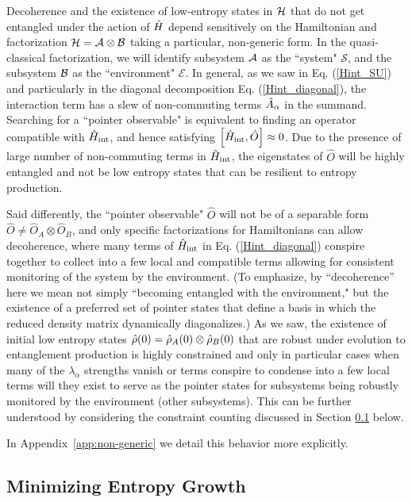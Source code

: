 \documentclass[aps,pra,onecolumn,nofootinbib,12pt,tightenlines]{revtex4-1}
\begin{document}
Decoherence and the existence of low-entropy states in $\mathcal{H}$ that do not get entangled under the action of $\hat{H}$ depend sensitively on the Hamiltonian and factorization  $\mathcal{H} = \mathcal{A} \otimes \mathcal{B}$ taking a particular, non-generic form. In the quasi-classical factorization, we will identify subsystem $\mathcal{A}$ as the ``system" $\mathcal{S}$, and the subsystem $\mathcal{B}$ as the ``environment" $\mathcal{E}$. In general, as we saw in Eq. (\ref{Hint_SU}) and particularly in the diagonal decomposition Eq. (\ref{Hint_diagonal}), the interaction term has a slew of non-commuting terms $\hat{A}_{\alpha}$ in the summand. Searching for a ``pointer observable" is equivalent to finding an operator compatible with $\hat{H}_{\rm{int}}$, and hence satisfying $\left[ \hat{H}_{\rm{int}}, \hat{O}\right] \approx 0$. Due to the presence of large number of non-commuting terms in $\hat{H}_{\rm{int}}$, the eigenstates of $\hat{O}$ will be highly entangled and not be low entropy states that can be resilient to entropy production. 

Said differently, the ``pointer observable" $\hat{O}$ will not be of a separable form $\hat{O} \neq \hat{O}_{A} \otimes \hat{O}_{B}$, and only specific factorizations for Hamiltonians can allow decoherence, where many terms of $\hat{H}_{\rm{int}}$ in Eq. (\ref{Hint_diagonal}) conspire together to collect into a  few local and compatible terms allowing for consistent monitoring of the system by the environment.
(To emphasize, by ``decoherence'' here we mean not simply ``becoming entangled with the environment," but the existence of a preferred set of pointer states that define a basis in which the reduced density matrix dynamically diagonalizes.)
As we saw, the existence of initial low entropy states $\hat{\rho}(0) = \hat{\rho}_{A}(0) \otimes \hat{\rho}_{B}(0)$ that are robust under evolution to entanglement production is highly constrained and only in particular cases when many of the $\lambda_{\alpha}$ strengths vanish or terms conspire to condense into a few local terms will they exist to serve as the pointer states for subsystems being robustly monitored by the environment (other subsystems). This can be further understood by considering the constraint counting discussed in Section \ref{subsec:min_entropy} below.

In Appendix~\ref{app:non-generic} we detail this behavior more explicitly.
 
 \subsection{Minimizing Entropy Growth}
\label{subsec:min_entropy}
\end{document}
